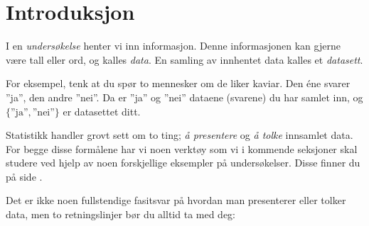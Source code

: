 



\section{Introduksjon}
I en \textit{undersøkelse} henter vi inn informasjon. Denne informasjonen kan gjerne være tall eller ord, og kalles \textit{data}. En samling av innhentet data kalles et \textit{datasett}. \vsk

For eksempel, tenk at du spør to mennesker om de liker kaviar. Den éne svarer ''ja'', den andre ''nei''. Da er ''ja'' og ''nei'' dataene (svarene) du har samlet inn, og $\{\text{''ja''}, \text{''nei''}\} $ er datasettet ditt. \vsk

Statistikk handler grovt sett om to ting;  \textsl{å presentere} og \textsl{å tolke} innsamlet data. For begge disse formålene har vi noen verktøy som vi i kommende seksjoner skal studere ved hjelp av noen forskjellige eksempler på undersøkelser. Disse finner du på side \pageref{undersok}. \vsk

Det er ikke noen fullstendige fasitsvar på hvordan man presenterer eller tolker data, men to retningslinjer bør du alltid ta med deg:\regv

